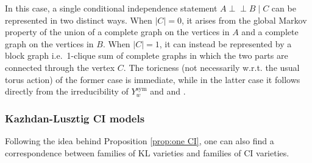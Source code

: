 \documentclass[11pt]{amsart}
\theoremstyle{definition}
\theoremstyle{definition}
\theoremstyle{definition}
\theoremstyle{definition}
\newcommand{\sym}{\mathrm{sym}}
\newcommand{\indep}{\perp \!\!\! \perp}
\begin{document}
\noindent In this case, a single conditional independence statement $A \indep B \mid C$ can be represented in two distinct ways. When $|C|=0$, it arises from the global Markov property of the union of a complete graph on the vertices in $A$ and a complete graph on the vertices in $B$. When $|C|=1$, it can instead be represented by a block graph i.e.\ 1-clique sum of complete graphs in which the two parts are connected through the vertex $C$. The toricness (not necessarily w.r.t. the usual torus action) of the former case is immediate, while in the latter case it follows directly from the irreducibility of $Y^{\sym}_w$ and \cite[Theorem 1.1]{biaggi2025binomiality} and \cite[Theorem 5]{misra2021gaussian}.


\subsubsection{Kazhdan-Lusztig CI models}

\noindent Following the idea behind Proposition \ref{prop:one CI}, one can also find a correspondence between families of KL varieties and families of CI varieties. 
\end{document}
